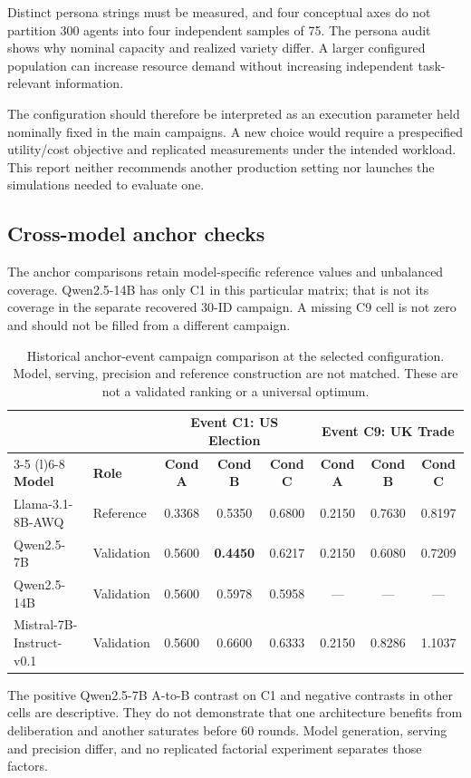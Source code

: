Distinct persona strings must be measured, and four conceptual axes do not partition 300 agents into four independent samples of 75. The persona audit shows why nominal capacity and realized variety differ. A larger configured population can increase resource demand without increasing independent task-relevant information.

The configuration should therefore be interpreted as an execution parameter held nominally fixed in the main campaigns. A new choice would require a prespecified utility/cost objective and replicated measurements under the intended workload. This report neither recommends another production setting nor launches the simulations needed to evaluate one.

\subsection{Cross-model anchor checks}
\label{sec:cross_model}
The anchor comparisons retain model-specific reference values and unbalanced coverage. Qwen2.5-14B has only C1 in this particular matrix; that is not its coverage in the separate recovered 30-ID campaign. A missing C9 cell is not zero and should not be filled from a different campaign.
\begin{table}[!htbp]
\centering
\caption{Historical anchor-event campaign comparison at the selected configuration. Model, serving, precision and reference construction are not matched. These are not a validated ranking or a universal optimum.}
\label{tab:cross_model_results}
\begin{tabular}{llcccccc}
\toprule
 & & \multicolumn{3}{c}{\textbf{Event C1: US Election}} & \multicolumn{3}{c}{\textbf{Event C9: UK Trade}} \\
\cmidrule(r){3-5} \cmidrule(l){6-8}
\textbf{Model} & \textbf{Role} & \textbf{Cond A} & \textbf{Cond B} & \textbf{Cond C} & \textbf{Cond A} & \textbf{Cond B} & \textbf{Cond C} \\
\midrule
Llama-3.1-8B-AWQ  & Reference  & 0.3368 & 0.5350 & 0.6800 & 0.2150 & 0.7630 & 0.8197 \\
Qwen2.5-7B    & Validation & 0.5600 & \textbf{0.4450} & 0.6217 & 0.2150 & 0.6080 & 0.7209 \\
Qwen2.5-14B   & Validation & 0.5600 & 0.5978 & 0.5958 & ---   & ---   & ---   \\
Mistral-7B-Instruct-v0.1    & Validation & 0.5600 & 0.6600 & 0.6333 & 0.2150 & 0.8286 & 1.1037 \\
\bottomrule
\end{tabular}
\setlength{\tabcolsep}{6pt}
\end{table}
The positive Qwen2.5-7B A-to-B contrast on C1 and negative contrasts in other cells are descriptive. They do not demonstrate that one architecture benefits from deliberation and another saturates before 60 rounds. Model generation, serving and precision differ, and no replicated factorial experiment separates those factors.

